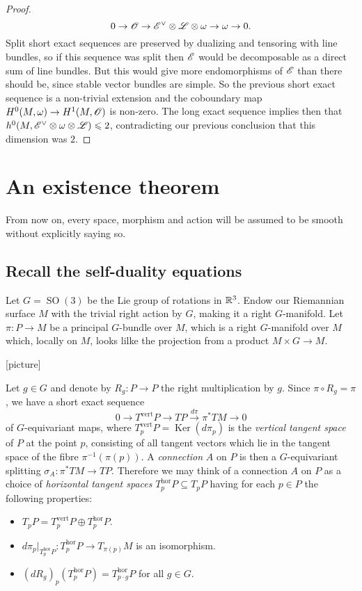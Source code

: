 \documentclass[A4paper, 12pt, british, reqno]{amsart}
\DeclareMathOperator{\SO}{SO}
\DeclareMathOperator{\Ker}{Ker}
\newcommand{\ot}{\otimes}
\newcommand{\op}{\oplus}
\newcommand{\dual}{^{\vee}}
\begin{document}
\begin{lm}
\begin{proof}
	\[ 0\to \O\to \E\dual\ot\L\ot\w\to \w\to 0. \]
	Split short exact sequences are preserved by dualizing and tensoring with line bundles, so if this sequence was split then $\mathscr{E}$ would be decomposable as a direct sum of line bundles.
	But this would give more endomorphisms of $\mathscr{E}$ than there should be, since stable vector bundles are simple.
	So the previous short exact sequence is a non-trivial extension and the coboundary map $H^{0}(M,\omega)\to H^{1}(M,\mathscr{O})$ is non-zero.
	The long exact sequence implies then that $h^{0}(M,\E\dual\ot \w\ot\L)\leqslant 2$, contradicting our previous conclusion that this dimension was $2$.
    \end{proof}
\end{lm}

\section{An existence theorem}

From now on, every space, morphism and action will be assumed to be smooth without explicitly saying so.

\subsection{Recall the self-duality equations}
Let $G=\SO(3)$ be the Lie group of rotations in $\mathbb{R}^{3}$.
Endow our Riemannian surface $M$ with the trivial right action by $G$, making it a right $G$-manifold.
Let $\pi\colon P\to M$ be a principal $G$-bundle over $M$, which is a right $G$-manifold over $M$ which, locally on $M$, looks lilke the projection from a product $M\times G\to M$.

[picture]

Let $g\in G$ and denote by $R_{g}\colon P\to P$ the right multiplication by $g$.
Since $\pi\circ R_{g}=\pi$, we have a short exact sequence
\[ 0\to T^{\mathrm{vert}}P\to TP\xrightarrow{d\pi} \pi^{*}TM \to 0 \]
of $G$-equivariant maps, where $T^{\mathrm{vert}}_{p}P=\Ker(d\pi_{p})$ is the \textit{vertical tangent space} of $P$ at the point $p$, consisting of all tangent vectors which lie in the tangent space of the fibre $\pi^{-1}(\pi(p))$.
A \textit{connection} $A$ on $P$ is then a $G$-equivariant splitting $\sigma_{A}\colon \pi^{*}TM\to TP$.
Therefore we may think of a connection $A$ on $P$ as a choice of \textit{horizontal tangent spaces} $T^{\mathrm{hor}}_{p}P\subseteq T_{p}P$ having for each $p\in P$ the following properties:
\begin{itemize}
    \item $T_{p}P=T^{\mathrm{vert}}_{p}P\op T^{\mathrm{hor}}_{p}P$.
    \item $d\pi_{p}\rvert_{T^{\mathrm{hor}}_{p}P}\colon T^{\mathrm{hor}}_{p}P\to T_{\pi(p)}M$ is an isomorphism.
    \item $(dR_{g})_{p}(T^{\mathrm{hor}}_{p}P)=T^{\mathrm{hor}}_{p\cdot g}P$ for all $g\in G$.
\end{itemize}
\end{document}
